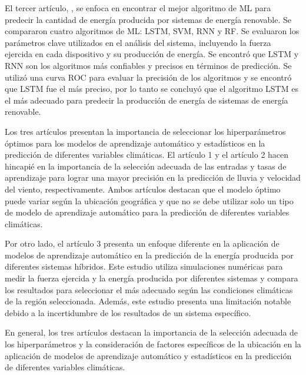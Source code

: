 \documentclass[12pt]{article}
\begin{document}
El tercer artículo, \citep{Mahsa}, se enfoca en encontrar el mejor algoritmo de ML para predecir la cantidad de energía producida por sistemas de energía renovable. Se compararon cuatro algoritmos de ML: LSTM, SVM, RNN y RF.
Se evaluaron los parámetros clave utilizados en el análisis del sistema, incluyendo la fuerza ejercida en cada dispositivo y su producción de energía. Se encontró que LSTM y RNN son los algoritmos más confiables y precisos en términos de predicción. Se utilizó una curva ROC para evaluar la precisión de los algoritmos y se encontró que LSTM fue el más preciso, por lo tanto se concluyó que el algoritmo LSTM es el más adecuado para predecir la producción de energía de sistemas de energía renovable.

Los tres artículos presentan la importancia de seleccionar los hiperparámetros óptimos para los modelos de aprendizaje automático y estadísticos en la predicción de diferentes variables climáticas. El artículo 1 y el artículo 2 hacen hincapié en la importancia de la selección adecuada de las entradas y tasas de aprendizaje para lograr una mayor precisión en la predicción de lluvia y velocidad del viento, respectivamente. Ambos artículos destacan que el modelo óptimo puede variar según la ubicación geográfica y que no se debe utilizar solo un tipo de modelo de aprendizaje automático para la predicción de diferentes variables climáticas.

Por otro lado, el artículo 3 presenta un enfoque diferente en la aplicación de modelos de aprendizaje automático en la predicción de la energía producida por diferentes sistemas híbridos. Este estudio utiliza simulaciones numéricas para medir la fuerza ejercida y la energía producida por diferentes sistemas y compara los resultados para seleccionar el más adecuado según las condiciones climáticas de la región seleccionada. Además, este estudio presenta una limitación notable debido a la incertidumbre de los resultados de un sistema específico.

En general, los tres artículos destacan la importancia de la selección adecuada de los hiperparámetros y la consideración de factores específicos de la ubicación en la aplicación de modelos de aprendizaje automático y estadísticos en la predicción de diferentes variables climáticas.



    
    
	
\end{document}
